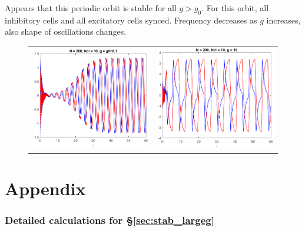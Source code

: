 \documentclass[11pt,reqno]{amsart}
\begin{document}
Appears that this periodic orbit is stable for all $g > g_0$. For this orbit, all inhibitory cells and all excitatory cells synced. Frequency decreases as $g$ increases, also shape of oscillations changes.

\begin{figure}[H]
\centering
\begin{tabular}{cc}
\includegraphics[width=8cm]{images/Iclustertimestep400_1.eps} &
\includegraphics[width=8cm]{images/Iclustertimestep400_2.eps}
\end{tabular}
\end{figure}

\section{Appendix}
\subsubsection{Detailed calculations for \S \ref{sec:stab_largeg}}
\end{document}
